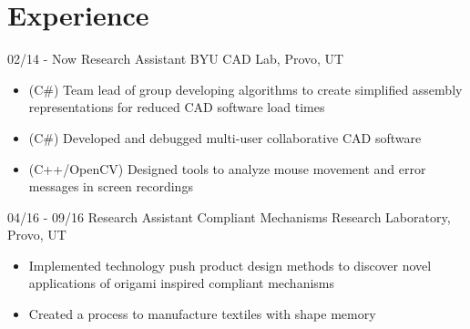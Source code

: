 \documentclass[]{friggeri-cv}
\begin{document}
\section{Experience}
\begin{entrylist}
  \entry
    {02/14 - Now}
    {Research Assistant}
    {BYU CAD Lab, Provo, UT}
    {\vspace{-4mm}
    \begin{itemize}
        \item (C\#) Team lead of group developing algorithms to create simplified assembly representations for reduced CAD software load times
        \item (C\#) Developed and debugged multi-user collaborative CAD software
        \item (C++/OpenCV) Designed tools to analyze mouse movement and error messages in screen recordings
    \end{itemize}\vspace{1mm}}
  \entry
    {04/16 - 09/16}
    {Research Assistant}
    {Compliant Mechanisms Research Laboratory, Provo, UT}
    {\vspace{-4mm}
    \begin{itemize}
        \item Implemented technology push product design methods to discover novel applications of origami inspired compliant mechanisms
        \item Created a process to manufacture textiles with shape memory
    \end{itemize}\vspace{1mm}}


\end{entrylist}
\end{document}
